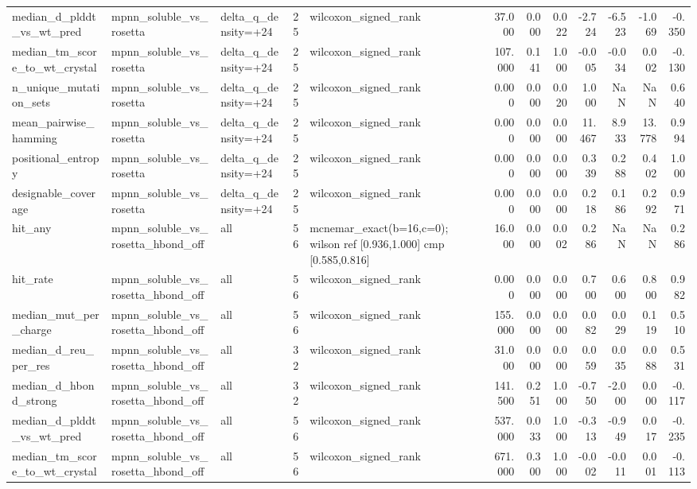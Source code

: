 \begin{table}
{\begin{tabular}{lllrlrrrrrrr}
median\_d\_plddt\_vs\_wt\_pred & mpnn\_soluble\_vs\_rosetta & delta\_q\_density=+24 & 25 & wilcoxon\_signed\_rank & 37.000 & 0.000 & 0.022 & -2.724 & -6.523 & -1.069 & -0.350 \\
median\_tm\_score\_to\_wt\_crystal & mpnn\_soluble\_vs\_rosetta & delta\_q\_density=+24 & 25 & wilcoxon\_signed\_rank & 107.000 & 0.141 & 1.000 & -0.005 & -0.034 & 0.002 & -0.130 \\
n\_unique\_mutation\_sets & mpnn\_soluble\_vs\_rosetta & delta\_q\_density=+24 & 25 & wilcoxon\_signed\_rank & 0.000 & 0.000 & 0.020 & 1.000 & NaN & NaN & 0.640 \\
mean\_pairwise\_hamming & mpnn\_soluble\_vs\_rosetta & delta\_q\_density=+24 & 25 & wilcoxon\_signed\_rank & 0.000 & 0.000 & 0.000 & 11.467 & 8.933 & 13.778 & 0.994 \\
positional\_entropy & mpnn\_soluble\_vs\_rosetta & delta\_q\_density=+24 & 25 & wilcoxon\_signed\_rank & 0.000 & 0.000 & 0.000 & 0.339 & 0.288 & 0.402 & 1.000 \\
designable\_coverage & mpnn\_soluble\_vs\_rosetta & delta\_q\_density=+24 & 25 & wilcoxon\_signed\_rank & 0.000 & 0.000 & 0.000 & 0.218 & 0.186 & 0.292 & 0.971 \\
hit\_any & mpnn\_soluble\_vs\_rosetta\_hbond\_off & all & 56 & mcnemar\_exact(b=16,c=0); wilson ref [0.936,1.000] cmp [0.585,0.816] & 16.000 & 0.000 & 0.002 & 0.286 & NaN & NaN & 0.286 \\
hit\_rate & mpnn\_soluble\_vs\_rosetta\_hbond\_off & all & 56 & wilcoxon\_signed\_rank & 0.000 & 0.000 & 0.000 & 0.700 & 0.600 & 0.800 & 0.982 \\
median\_mut\_per\_charge & mpnn\_soluble\_vs\_rosetta\_hbond\_off & all & 56 & wilcoxon\_signed\_rank & 155.000 & 0.000 & 0.000 & 0.082 & 0.029 & 0.119 & 0.510 \\
median\_d\_reu\_per\_res & mpnn\_soluble\_vs\_rosetta\_hbond\_off & all & 32 & wilcoxon\_signed\_rank & 31.000 & 0.000 & 0.000 & 0.059 & 0.035 & 0.088 & 0.531 \\
median\_d\_hbond\_strong & mpnn\_soluble\_vs\_rosetta\_hbond\_off & all & 32 & wilcoxon\_signed\_rank & 141.500 & 0.251 & 1.000 & -0.750 & -2.000 & 0.000 & -0.117 \\
median\_d\_plddt\_vs\_wt\_pred & mpnn\_soluble\_vs\_rosetta\_hbond\_off & all & 56 & wilcoxon\_signed\_rank & 537.000 & 0.033 & 1.000 & -0.313 & -0.949 & 0.017 & -0.235 \\
median\_tm\_score\_to\_wt\_crystal & mpnn\_soluble\_vs\_rosetta\_hbond\_off & all & 56 & wilcoxon\_signed\_rank & 671.000 & 0.300 & 1.000 & -0.002 & -0.011 & 0.001 & -0.113 \\

\end{tabular}}
\end{table}
